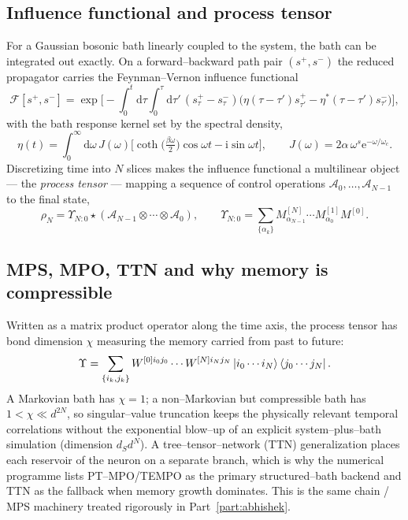 \documentclass[11pt,a4paper]{article}
\theoremstyle{plain}
\theoremstyle{definition}
\theoremstyle{remark}
\newcommand{\ee}{\mathrm{e}}
\newcommand{\ii}{\mathrm{i}}
\renewcommand{\d}{\mathrm{d}}
\begin{document}
\subsection{Influence functional and process tensor}
For a Gaussian bosonic bath linearly coupled to the system, the bath can
be integrated out exactly. On a forward--backward path pair
$(s^+,s^-)$ the reduced propagator carries the Feynman--Vernon influence
functional
\begin{equation}
\mathcal F[s^+,s^-]
=\exp\!\Big[-\!\int_0^t\!\d\tau\!\int_0^\tau\!\d\tau'\,
(s^+_\tau-s^-_\tau)\big(\eta(\tau-\tau')s^+_{\tau'}
-\eta^\ast(\tau-\tau')s^-_{\tau'}\big)\Big],
\end{equation}
with the bath response kernel set by the spectral density,
\begin{equation}
\eta(t)=\int_0^\infty\!\d\omega\,J(\omega)
\Big[\coth\!\big(\tfrac{\beta\omega}{2}\big)\cos\omega t-\ii\sin\omega t\Big],
\qquad J(\omega)=2\alpha\,\omega^s\ee^{-\omega/\omega_c}.
\label{eq:influence}
\end{equation}
Discretizing time into $N$ slices makes the influence functional a
multilinear object --- the \emph{process tensor} --- mapping a sequence of
control operations $\mathcal A_0,\ldots,\mathcal A_{N-1}$ to the final
state,
\begin{equation}
\rho_N=\Upsilon_{N:0}\star(\mathcal A_{N-1}\otimes\cdots\otimes\mathcal A_0),
\qquad
\Upsilon_{N:0}=\sum_{\{\alpha_k\}}M^{[N]}_{\alpha_{N-1}}\cdots
M^{[1]}_{\alpha_0}M^{[0]} .
\label{eq:PT}
\end{equation}

\subsection{MPS, MPO, TTN and why memory is compressible}
Written as a matrix product operator along the time axis, the process
tensor has bond dimension $\chi$ measuring the memory carried from past to
future:
\begin{equation}
\Upsilon=\sum_{\{i_k,j_k\}}W^{[0]i_0j_0}\cdots W^{[N]i_Nj_N}
\ket{i_0\cdots i_N}\bra{j_0\cdots j_N} .
\end{equation}
A Markovian bath has $\chi=1$; a non--Markovian but compressible bath has
$1<\chi\ll d^{2N}$, so singular--value truncation keeps the physically
relevant temporal correlations without the exponential blow--up of an
explicit system--plus--bath simulation (dimension $d_Sd^N$). A
tree--tensor--network (TTN) generalization places each reservoir of the
neuron on a separate branch, which is why the numerical programme lists
PT--MPO/TEMPO as the primary structured--bath backend and TTN as the
fallback when memory growth dominates. This is the same chain / MPS
machinery treated rigorously in Part~\ref{part:abhishek}.
\end{document}
